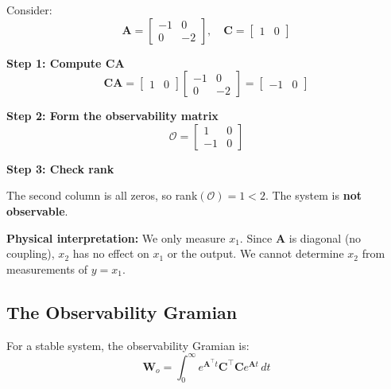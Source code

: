 \begin{example}
\label{ex:unobservable}
Consider:
\begin{equation}
\mathbf{A} = \begin{bmatrix} -1 & 0 \\ 0 & -2 \end{bmatrix}, \quad \mathbf{C} = \begin{bmatrix} 1 & 0 \end{bmatrix}
\end{equation}

\textbf{Step 1: Compute $\mathbf{C}\mathbf{A}$}
\begin{equation}
\mathbf{C}\mathbf{A} = \begin{bmatrix} 1 & 0 \end{bmatrix}\begin{bmatrix} -1 & 0 \\ 0 & -2 \end{bmatrix} = \begin{bmatrix} -1 & 0 \end{bmatrix}
\end{equation}

\textbf{Step 2: Form the observability matrix}
\begin{equation}
\mathcal{O} = \begin{bmatrix} 1 & 0 \\ -1 & 0 \end{bmatrix}
\end{equation}

\textbf{Step 3: Check rank}

The second column is all zeros, so rank$(\mathcal{O}) = 1 < 2$. The system is \textbf{not observable}.

\textbf{Physical interpretation:} We only measure $x_1$. Since $\mathbf{A}$ is diagonal (no coupling), $x_2$ has no effect on $x_1$ or the output. We cannot determine $x_2$ from measurements of $y = x_1$.
\end{example}

\subsection{The Observability Gramian}

\begin{definition}
For a stable system, the observability Gramian is:
\begin{equation}
\mathbf{W}_o = \int_0^\infty e^{\mathbf{A}^\top t}\mathbf{C}^\top\mathbf{C} e^{\mathbf{A}t}\,dt
\label{eq:observability_gramian}
\end{equation}
\end{definition}

